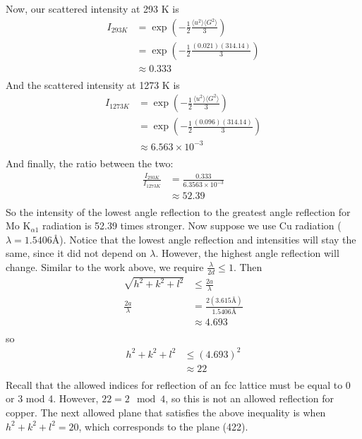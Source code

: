 \documentclass{article}
\begin{document}
Now, our scattered intensity at 293 K is
\begin{align*}
    I_{293 K} &= \exp{\left(-\frac{1}{2}\frac{\langle u^2 \rangle \langle G^2 \rangle}{3}\right)}\\
    &= \exp{\left(-\frac{1}{2}\frac{(0.021)(314.14)}{3}\right)} \\
    &\approx 0.333 \\
\end{align*}
And the scattered intensity at 1273 K is
\begin{align*}
    I_{1273 K} &= \exp{\left(-\frac{1}{2} \frac{\langle u^2 \rangle \langle G^2 \rangle}{3}\right)} \\
    &= \exp{\left(-\frac{1}{2}\frac{(0.096)(314.14)}{3}\right)} \\
    &\approx 6.563\times 10^{-3} \\
\end{align*}
And finally, the ratio between the two:
\begin{align*}
    \frac{I_{293 K}}{I_{1273 K}} &= \frac{0.333}{6.3563 \times 10^{-3}} \\
    &\approx 52.39 \\
\end{align*}
So the intensity of the lowest angle reflection to the greatest angle reflection for Mo $\text{K}_{\alpha 1}$ radiation is 52.39 times stronger.
\newline
Now suppose we use Cu radiation ($\lambda = 1.5406 \text{\AA}$). Notice that the lowest angle reflection and intensities will stay the same, since it did not depend on $\lambda$. However, the highest angle reflection will change. Similar to the work above, we require $\frac{\lambda}{2d} \leq 1$. Then
\begin{align*}
    \sqrt{h^2 + k^2 + l^2} &\leq \frac{2a}{\lambda} \\
    \frac{2a}{\lambda} &= \frac{2(3.615 \text{\AA})}{1.5406\text{\AA}} \\
    &\approx 4.693 \\
\end{align*}
so 
\begin{align*}
    h^2 + k^2 + l^2 &\leq (4.693)^2 \\
    &\approx 22 \\
\end{align*}
Recall that the allowed indices for reflection of an fcc lattice must be equal to 0 or 3 mod 4. However, $22 = 2 \mod{4}$, so this is not an allowed reflection for copper. The next allowed plane that satisfies the above inequality is when $h^2 + k^2 + l^2 = 20$, which corresponds to the plane (422).
\end{document}
